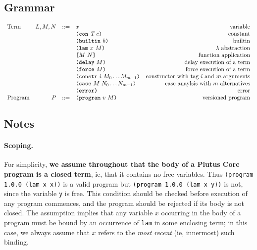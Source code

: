 \subsection{Grammar}
\begin{minipage}{\linewidth}
    \centering
    \[\begin{array}{lrclr}
    \textrm{Term}       & L,M,N  & ::= & x                               & \textrm{variable}\\
                        &        &     & \texttt{(} \texttt{con} ~ \textit{T} ~ c \texttt{)}                    & \textrm{constant}\\
                        &        &     & \texttt{(} \texttt{builtin} ~ \mathit{b} \texttt{)}                     & \textrm{builtin}\\
                        &        &     & \texttt{(} \texttt{lam} ~ x ~ M  \texttt{)}                     & \textrm{$\lambda$ abstraction}\\
                        &        &     & \texttt{[} M ~ N \texttt{]}                     & \textrm{function application}\\
                        &        &     & \texttt{(} \texttt{delay} ~ M \texttt{)}                       & \textrm{delay execution of a term}\\
                        &        &     & \texttt{(} \texttt{force} ~ M \texttt{)}                       & \textrm{force execution of a term}\\
                        &        &     & \texttt{(} \texttt{constr} ~ i ~ M_0 \ldots M_{m-1} \texttt{)}  & \textrm{constructor with tag $i$ and $m$ arguments}\\
                        &        &     & \texttt{(} \texttt{case} ~ M ~ N_0 \ldots N_{m-1} \texttt{)}    & \textrm{case anaylsis with $m$ alternatives}\\
                        &        &     & \texttt{(} \texttt{error} \texttt{)}                         & \textrm{error}\\
        \textrm{Program}& P      & ::= & \texttt{(} \texttt{program} ~ v ~ M \texttt{)}                  & \textrm{versioned program}

    \end{array}\]
    \label{fig:untyped-grammar}
\end{minipage}


\subsection{Notes}
\label{sec:grammar-notes}
\paragraph{Scoping.} For simplicity, \textbf{we assume throughout that the body of a
Plutus Core program is a closed term}, ie, that it contains no free
variables.  Thus \texttt{(program 1.0.0 (lam x x))} is a valid program but
\texttt{(program 1.0.0 (lam x y))} is not, since the variable \texttt{y} is
free. This condition should be checked before execution of any program
commences, and the program should be rejected if its body is not closed.  The
assumption implies that any variable $x$ occurring in the body of a program must
be bound by an occurrence of \texttt{lam} in some enclosing term; in this case,
we always assume that $x$ refers to the \textit{most recent} (ie, innermost)
such binding.

